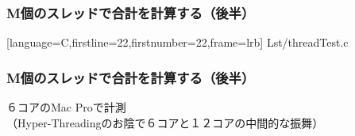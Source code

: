 \documentclass{beamer}                   %
\begin{document}
\begin{frame}[fragile]
  \frametitle{M個のスレッドで合計を計算する（後半）}
  
      [language={C},firstline=22,firstnumber=22,frame=lrb]
      {Lst/threadTest.c}
\end{frame}

\begin{frame}[fragile]
  \frametitle{M個のスレッドで合計を計算する（後半）}
  ６コアのMac Proで計測\\
  （Hyper-Threadingのお陰で６コアと１２コアの中間的な振舞）
\end{frame}
\end{document}

